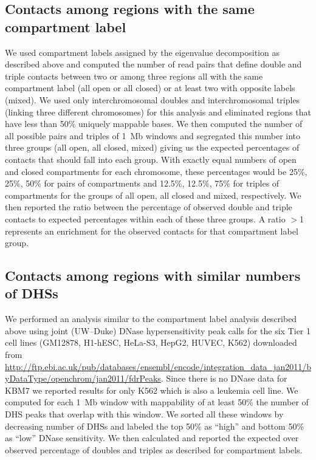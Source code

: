 \subsection{Contacts among regions with the same compartment label}
We used compartment labels assigned by the eigenvalue decomposition as described
above and computed the number of read pairs that define double and triple contacts
between two or among three regions all with the same compartment label
(all open or all closed) or at least two with opposite labels (mixed). We used
only interchromosomal doubles and interchromosomal triples (linking three different chromosomes)
for this analysis and eliminated regions that have less than 50\% uniquely mappable bases.
We then computed the number of all possible pairs and triples
of 1~Mb windows and segregated this number into three groups (all open, all closed, mixed)
giving us the expected percentages of contacts that should fall into each group.
With exactly equal numbers of open and closed compartments for each chromosome,
these percentages would be 25\%, 25\%, 50\% for pairs of compartments and
12.5\%, 12.5\%, 75\%  for triples of compartments for the groups of all open,
all closed and mixed, respectively. We then reported the ratio between the percentage
of observed double and triple contacts to expected percentages within each of these
three groups. A ratio $>$1 represents an enrichment for the observed
contacts for that compartment label group.

\subsection{Contacts among regions with similar numbers of DHSs}
We performed an analysis similar to the compartment label analysis described above
using joint (UW--Duke) DNase hypersensitivity peak calls for the six Tier 1 cell lines
(GM12878, H1-hESC, HeLa-S3, HepG2, HUVEC, K562)
downloaded from \url{http://ftp.ebi.ac.uk/pub/databases/ensembl/encode/integration_data_jan2011/byDataType/openchrom/jan2011/fdrPeaks}.
Since there is no DNase data for KBM7 we reported results for only K562
which is also a leukemia cell line. We computed for each 1~Mb window with
mappability of at least 50\% the number of DHS peaks that overlap with this
window. We sorted all these windows by decreasing number of DHSs
and labeled the top 50\% as ``high'' and bottom 50\% as ``low'' DNase
sensitivity. We then calculated and reported the expected over observed
percentage of doubles and triples as described for compartment labels.

